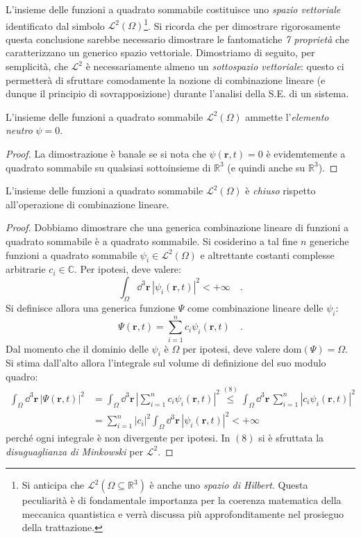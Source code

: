 L'insieme delle funzioni a quadrato sommabile costituisce uno \emph{spazio vettoriale} identificato dal simbolo $\mathcal{L}^2(\Omega)$\footnote{Si anticipa che $\mathcal{L}^2(\Omega \subseteq \mathbb{R}^3)$ è anche uno \emph{spazio di Hilbert}. Questa peculiarità è di fondamentale importanza per la coerenza matematica della meccanica quantistica e verrà discussa più approfonditamente nel prosieguo della trattazione.}. Si ricorda che per dimostrare rigorosamente questa conclusione sarebbe necessario dimostrare le fantomatiche \emph{7 proprietà} che caratterizzano un generico spazio vettoriale. Dimostriamo di seguito, per semplicità, che $\mathcal{L}^2$ è necessariamente almeno un \emph{sottospazio vettoriale}: questo ci permetterà di sfruttare comodamente la nozione di combinazione lineare (e dunque il principio di sovrapposizione) durante l'analisi della S.E. di un sistema.
\begin{proprietà}
    L'insieme delle funzioni a quadrato sommabile $\mathcal{L}^2(\Omega)$ ammette l'\emph{elemento neutro} $\psi = 0$.
\end{proprietà}
\begin{proof}
    La dimostrazione è banale se si nota che $\psi(\bm{r},t) = 0$ è evidemtemente a quadrato sommabile su qualsiasi sottoinsieme di $\mathbb{R}^3$ (e quindi anche su $\mathbb{R}^3$).
\end{proof}
\begin{proprietà}
    L'insieme delle funzioni a quadrato sommabile $\mathcal{L}^2(\Omega)$ è \emph{chiuso} rispetto all'operazione di combinazione lineare.
\end{proprietà}
\begin{proof}
    Dobbiamo dimostrare che una generica combinazione lineare di funzioni a quadrato sommabile è a quadrato sommabile. Si cosiderino a tal fine $n$ generiche funzioni a quadrato sommabile $\psi_i \in \mathcal{L}^2(\Omega)$ e altrettante costanti complesse arbitrarie $c_i \in \mathbb{C}$. Per ipotesi, deve valere:
    \[
        \int_{\Omega} \dd^3{\bm{r}} \, |\psi_i(\bm{r},t)|^2 < +\infty \quad.
    \]
    Si definisce allora una generica funzione $\Psi$ come combinazione lineare delle $\psi_i$:
    \[
        \Psi(\bm{r},t) = \sum_{i=1}^n c_i \psi_i(\bm{r},t) \quad.
    \]
    Dal momento che il dominio delle $\psi_i$ è $\Omega$ per ipotesi, deve valere $\text{dom}(\Psi) = \Omega$. Si stima dall'alto allora l'integrale sul volume di definizione del suo modulo quadro:
    \[
        \begin{aligned}
            \int_{\Omega} \dd^3{\bm{r}} \, |\Psi(\bm{r},t)|^2 &= \int_{\Omega} \dd^3{\bm{r}} \, \left|\sum_{i=1}^n c_i \psi_i(\bm{r},t)\right|^2 \overset{(8)}{\leq} \int_{\Omega} \dd^3{\bm{r}} \,\sum_{i=1}^n |c_i \psi_i(\bm{r},t)|^2 \\
            &= \sum_{i=1}^n |c_i|^2 \int_{\Omega} \dd^3{\bm{r}} \,|\psi_i(\bm{r},t)|^2 < +\infty 
        \end{aligned}
    \]
    perché ogni integrale è non divergente per ipotesi. In $(8)$ si è sfruttata la \emph{disuguaglianza di Minkowski} per $\mathcal{L}^2$. 
\end{proof}

